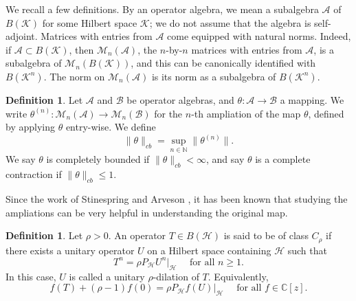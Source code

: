 \documentclass[12pt]{amsart}
\theoremstyle{definition}
\newtheorem{definition}[theorem]{Definition}
\newcommand{\A}{{\mathcal A}}
\newcommand{\B}{{\mathcal B}}
\renewcommand{\H}{{\mathcal H}}
\newcommand{\K}{{\mathcal K}}
\newcommand\C{{\mathbb C}}
\newcommand\matn{{\mathcal M}_n}
\begin{document}
We recall a few definitions.
By an operator algebra, we mean  a  subalgebra $\mathcal{A}$ of $B(\mathcal{K})$
for some Hilbert space $\mathcal{K}$; we do not assume that the algebra is self-adjoint. Matrices with entries from $\A$ come  equipped with natural norms. Indeed, if 
 $\A \subset B(\K)$, then $\matn(\A)$, the $n$-by-$n$ matrices with entries from $\A$,
is a subalgebra of $\matn(B(\mathcal{K}))$, and this can be canonically identified with 
$ B(\mathcal{K}^n)$. The norm on $\matn(\A)$ is its norm as a subalgebra of  $ B(\mathcal{K}^n)$.


\begin{definition}
\label{defbc}
Let $\A $ and $\B $ be operator algebras, and $\theta: \A \to \B$ a mapping.
We write $\theta^{(n)}: \matn(\mathcal{A}) \to \matn(\B)$ for the $n$-th ampliation of the map $\theta$, defined by applying $\theta$ entry-wise.
We define \[
\| \theta\|_{cb} = \sup_{n \in {\mathbb N}} \| \theta^{(n)}\|.\] We say $\theta$ is completely bounded if
$\| \theta \|_{cb} < \infty$, and say $\theta$ is a complete contraction if
$\| \theta \|_{cb} \le 1$.
\end{definition}
Since the work of Stinespring \cite{Stinespring55} and Arveson \cite{Arveson69}, it has been known that studying the ampliations can be very helpful in understanding the original map.
\begin{definition}
\label{def_crho}
Let $\rho > 0$. An operator $T \in B(\mathcal{H})$ is said to be of class $C_\rho$ if there exists a unitary operator $U$ on a Hilbert space containing $\mathcal{H}$ such that
\begin{equation*}
  T^n = \rho P_{\mathcal{H}} U^n \big|_{\mathcal{H}} \quad \text{ for all } n \ge 1.
\end{equation*}
In this case, $U$ is called a unitary $\rho$-dilation of $T$.
Equivalently,
\begin{equation}
  \label{eqn:rho_dilation}
  f(T) + (\rho-1) f(0) = \rho P_{\mathcal{H}} f(U) \big|_{\mathcal{H}} \quad \text{ for all } f \in \mathbb{C}[z].
\end{equation}
\end{definition}
\end{document}
